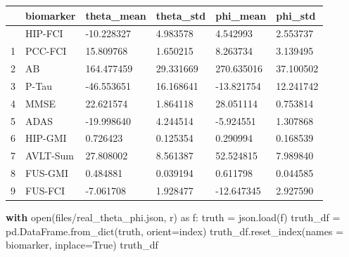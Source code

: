 \documentclass[
  letterpaper,
  DIV=11,
  numbers=noendperiod]{scrreprt}
\newenvironment{Shaded}{\begin{snugshade}}{\end{snugshade}}
\newcommand{\BuiltInTok}[1]{\textcolor[rgb]{0.00,0.23,0.31}{#1}}
\newcommand{\ControlFlowTok}[1]{\textcolor[rgb]{0.00,0.23,0.31}{\textbf{#1}}}
\newcommand{\ImportTok}[1]{\textcolor[rgb]{0.00,0.46,0.62}{#1}}
\newcommand{\NormalTok}[1]{\textcolor[rgb]{0.00,0.23,0.31}{#1}}
\newcommand{\OperatorTok}[1]{\textcolor[rgb]{0.37,0.37,0.37}{#1}}
\newcommand{\StringTok}[1]{\textcolor[rgb]{0.13,0.47,0.30}{#1}}
\newcommand{\VariableTok}[1]{\textcolor[rgb]{0.07,0.07,0.07}{#1}}
\begin{document}
\begin{longtable}[]{@{}llllll@{}}
\toprule\noalign{}
& biomarker & theta\_mean & theta\_std & phi\_mean & phi\_std \\
\midrule\noalign{}
\endhead
\bottomrule\noalign{}
\endlastfoot
0 & HIP-FCI & -10.228327 & 4.983578 & 4.542993 & 2.553737 \\
1 & PCC-FCI & 15.809768 & 1.650215 & 8.263734 & 3.139495 \\
2 & AB & 164.477459 & 29.331669 & 270.635016 & 37.100502 \\
3 & P-Tau & -46.553651 & 16.168641 & -13.821754 & 12.241742 \\
4 & MMSE & 22.621574 & 1.864118 & 28.051114 & 0.753814 \\
5 & ADAS & -19.998640 & 4.244514 & -5.924551 & 1.307868 \\
6 & HIP-GMI & 0.726423 & 0.125354 & 0.290994 & 0.168539 \\
7 & AVLT-Sum & 27.808002 & 8.561387 & 52.524815 & 7.989840 \\
8 & FUS-GMI & 0.484881 & 0.039194 & 0.611798 & 0.044585 \\
9 & FUS-FCI & -7.061708 & 1.928477 & -12.647345 & 2.927590 \\
\end{longtable}

\begin{Shaded}
\begin{Highlighting}[]
\ControlFlowTok{with} \BuiltInTok{open}\NormalTok{(}\StringTok{\textquotesingle{}files/real\_theta\_phi.json\textquotesingle{}}\NormalTok{, }\StringTok{\textquotesingle{}r\textquotesingle{}}\NormalTok{) }\ImportTok{as}\NormalTok{ f:}
\NormalTok{    truth }\OperatorTok{=}\NormalTok{ json.load(f)}
\NormalTok{truth\_df }\OperatorTok{=}\NormalTok{ pd.DataFrame.from\_dict(truth, orient}\OperatorTok{=}\StringTok{\textquotesingle{}index\textquotesingle{}}\NormalTok{)}
\NormalTok{truth\_df.reset\_index(names }\OperatorTok{=} \StringTok{\textquotesingle{}biomarker\textquotesingle{}}\NormalTok{, inplace}\OperatorTok{=}\VariableTok{True}\NormalTok{)}
\NormalTok{truth\_df}
\end{Highlighting}
\end{Shaded}
\end{document}
